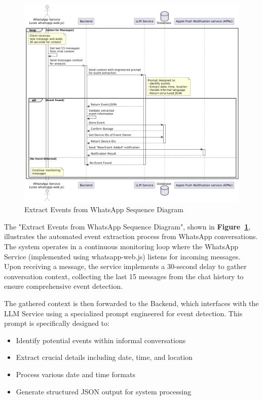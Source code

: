 \begin{figure}[!h]
  \centering
  \includegraphics[width=\textwidth]{images/docs/diagrams/sequence-diagrams/all-sequence-diagrams/Extract Events from WhatsApp.png}
  \caption{Extract Events from WhatsApp Sequence Diagram}
  \label{fig:seq/extract-events-whatsapp}
\end{figure}

The "Extract Events from WhatsApp Sequence Diagram", shown in \textbf{Figure~\ref{fig:seq/extract-events-whatsapp}}, illustrates the automated event extraction process from WhatsApp conversations. The system operates in a continuous monitoring loop where the WhatsApp Service (implemented using whatsapp-web.js) listens for incoming messages. Upon receiving a message, the service implements a 30-second delay to gather conversation context, collecting the last 15 messages from the chat history to ensure comprehensive event detection.

The gathered context is then forwarded to the Backend, which interfaces with the LLM Service using a specialized prompt engineered for event detection. This prompt is specifically designed to:
\begin{itemize}
  \item Identify potential events within informal conversations
  \item Extract crucial details including date, time, and location
  \item Process various date and time formats
  \item Generate structured JSON output for system processing
\end{itemize}

